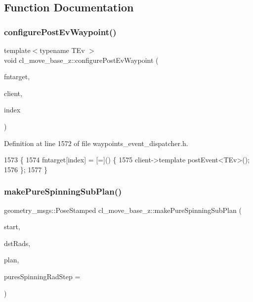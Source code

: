 \subsection{Function Documentation}
\mbox{\label{namespacecl__move__base__z_aee32c533c534df96361bb9622017e8e3}} 
\subsubsection{\texorpdfstring{configure\+Post\+Ev\+Waypoint()}{configurePostEvWaypoint()}}
{\footnotesize\ttfamily template$<$typename T\+Ev $>$ \\
void cl\+\_\+move\+\_\+base\+\_\+z\+::configure\+Post\+Ev\+Waypoint (\begin{DoxyParamCaption}\item[{std\+::function$<$ void()$>$ $\ast$}]{fntarget,  }\item[{\hyperlink{classcl__move__base__z_1_1ClMoveBaseZ}{Cl\+Move\+BaseZ} $\ast$}]{client,  }\item[{int}]{index }\end{DoxyParamCaption})}



Definition at line 1572 of file waypoints\+\_\+event\+\_\+dispatcher.\+h.


\begin{DoxyCode}
1573 \{
1574     fntarget[index] = [=]() \{
1575         client->template postEvent<TEv>();
1576     \};
1577 \}
\end{DoxyCode}
\mbox{\label{namespacecl__move__base__z_ac774e138510eb7b5e0015be1f7709e19}} 
\subsubsection{\texorpdfstring{make\+Pure\+Spinning\+Sub\+Plan()}{makePureSpinningSubPlan()}}
{\footnotesize\ttfamily geometry\+\_\+msgs\+::\+Pose\+Stamped cl\+\_\+move\+\_\+base\+\_\+z\+::make\+Pure\+Spinning\+Sub\+Plan (\begin{DoxyParamCaption}\item[{const geometry\+\_\+msgs\+::\+Pose\+Stamped \&}]{start,  }\item[{double}]{dst\+Rads,  }\item[{std\+::vector$<$ geometry\+\_\+msgs\+::\+Pose\+Stamped $>$ \&}]{plan,  }\item[{double}]{pures\+Spinning\+Rad\+Step = {} }\end{DoxyParamCaption})}



